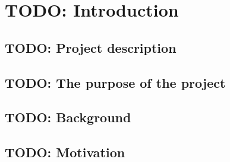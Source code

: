 \chapter{TODO: Introduction}
\section{TODO: Project description}
\section{TODO: The purpose of the project}
\section{TODO: Background}
\section{TODO: Motivation}


